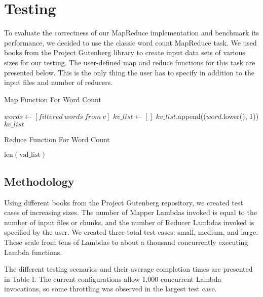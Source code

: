 \section{Testing}

To evaluate the correctness of our MapReduce implementation and benchmark its performance, we decided to use the classic word count MapReduce task. We used books from the Project Gutenberg library to create input data sets of various sizes for our testing. The user-defined map and reduce functions for this task are presented below. This is the only thing the user has to specify in addition to the input files and number of reducers.

\begin{algorithm}
\caption{Map Function For Word Count}
\begin{algorithmic}[1]
    \State $words \gets [filtered~words~from~v]$
    \State $kv\_list \gets []$
        \State $kv\_list$.append(($word$.lower(), 1))
    \EndFor
    \State \Return $kv\_list$
\EndFunction
\end{algorithmic}
\end{algorithm}

\begin{algorithm}
\caption{Reduce Function For Word Count}
\begin{algorithmic}[2]
    \State \Return $\text{len}(\text{val\_list})$
\EndFunction
\end{algorithmic}
\end{algorithm}

\subsection{Methodology}

Using different books from the Project Gutenberg repository, we created test cases of increasing sizes. The number of Mapper Lambdas invoked is equal to the number of input files or chunks, and the number of Reducer Lambdas invoked is specified by the user. We created three total test cases: small, medium, and large. These scale from tens of Lambdas to about a thousand concurrently executing Lambda functions.

The different testing scenarios and their average completion times are presented in Table I. The current configurations allow 1,000 concurrent Lambda invocations, so some throttling was observed in the largest test case.

